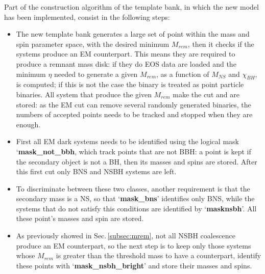 \documentclass[binding=0.6cm, LaM]{sapthesis}
\begin{document}
	Part of the construction algorithm of the template bank, 
	in which the new model has been implemented, 
	consist in the following steps:
	\begin{itemize} 
	\item The new template bank generates a large set of point within the mass and spin parameter space,
        with the desired minimum $M_{rem}$, then it checks if the systems produce an EM counterpart.
        This means they are required to produce a remnant mass disk:
        if they do EOS data are loaded and the minimum $\eta$ needed to generate a given $M_{rem}$,
        as a function of $M_{NS}$ and $\chi_{BH}$,  is computed;
        if this is not the case the binary is treated as point particle binaries.
        All system that produce the given $M_{rem}$ make the cut and are stored:
        as the EM cut can remove several randomly generated binaries,
        the numbers of accepted points needs to be tracked and stopped when they are enough.
        \item First all EM dark systems needs to be identified using the logical mask ‘\textbf{{\color{red}mask\_not\_bbh}},
        which track points that are not BBH: a point is kept if the secondary object is not a BH,
        then its masses and spins are stored.
        After this first cut only BNS and NSBH systems are left.
        \item To discriminate between these two classes, another requirement is that the secondary mass is a NS,
        so that ‘\textbf{{\color{green}mask\_bns}}’ identifies only BNS, while the systems that do not satisfy this conditions
        are identified by ‘\textbf{{\color{black}masknsbh}}’.
        All these point’s masses and spin are stored.
        \item As previously showed in Sec.\,\ref{subsec:mrem}, not all NSBH coalescence produce an EM counterpart,
        so the next step is to keep only those systems whose $M_{rem}$ is greater than the threshold mass to have a counterpart,
        identify these points with ‘\textbf{{\color{blue}mask\_nsbh\_bright}}’ and store their masses and spins.
	\end{itemize}
		
\end{document}
